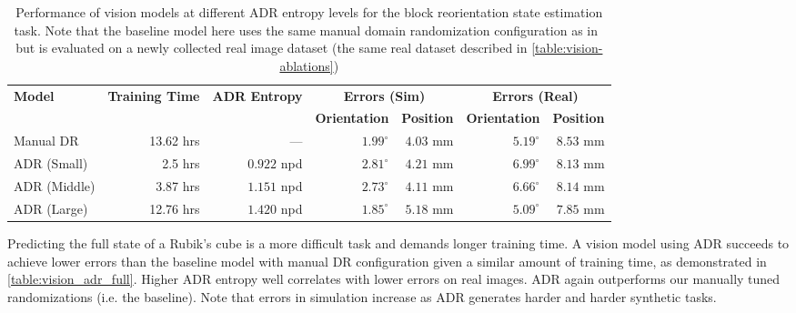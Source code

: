 \begin{table}[h]
    \caption{Performance of vision models at different ADR entropy levels for the block reorientation state estimation task. Note that the baseline model here uses the same manual domain randomization configuration as in~\cite{openai2018learning} but is evaluated on a newly collected real image dataset (the same real dataset described in \autoref{table:vision-ablations})}
    \centering
    \renewcommand{\arraystretch}{1.3}
    \begin{tabular}{@{}lrr|rr|rr@{}}
        \toprule
        \multirow{2}{*}{\textbf{Model}} & \multirow{2}{*}{\textbf{Training Time}} & \multirow{2}{*}{\textbf{ADR Entropy}} & \multicolumn{2}{c}{\textbf{Errors (Sim)}} & \multicolumn{2}{c}{\textbf{Errors (Real)}} \\
        & & & \textbf{Orientation} & \textbf{Position} & \textbf{Orientation} & \textbf{Position} \\
        \midrule
        Manual DR &  13.62 hrs & --- & $1.99^\circ$ & $4.03$ mm & $5.19^\circ$ & $8.53$ mm \\
        \midrule
        ADR (Small) & 2.5 hrs & $0.922$ npd & $2.81^\circ$ & $4.21$ mm & $6.99^\circ$ & $8.13$ mm \\
        ADR (Middle) & 3.87 hrs & $1.151$ npd & $2.73^\circ$ & $4.11$ mm & $6.66^\circ$ & $8.14$ mm \\
        ADR (Large) & 12.76 hrs & $\mathbf{1.420}$ npd & $1.85^\circ$ & $5.18$ mm & $\mathbf{5.09}^\circ$ & $\mathbf{7.85}$ mm \\
        \bottomrule
    \end{tabular}
    \label{table:vision_adr_locked}
\end{table}


Predicting the full state of a Rubik's cube is a more difficult task and demands longer training time. A vision model using ADR succeeds to achieve lower errors than the baseline model with manual DR configuration given a similar amount of training time, as demonstrated in \autoref{table:vision_adr_full}. Higher ADR entropy well correlates with lower errors on real images. ADR again outperforms our manually tuned randomizations (i.e. the baseline). Note that errors in simulation increase as ADR generates harder and harder synthetic tasks.



